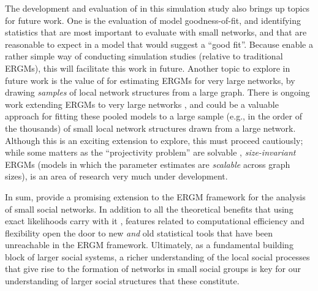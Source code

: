 \documentclass[review, nonatbib,doubleblind]{elsarticle/elsarticle}
\begin{document}
The development and evaluation of \ergmitos{} in this simulation study also brings up topics for future work. One is the evaluation of model goodness-of-fit, and identifying statistics that are most important to evaluate with small networks, and that are reasonable to expect in a model that would suggest a ``good fit''. Because \ergmitos{} enable a rather simple way of conducting simulation studies (relative to traditional ERGMs), this will facilitate this work in future. Another topic to explore in future work is the value of \ergmitos{} for estimating ERGMs for very large networks, by drawing \textit{samples} of local network structures from a large graph. There is ongoing work extending ERGMs to very large networks \cite{STIVALA2016167,Stivala2020}, and \ergmitos{} could be a valuable approach for fitting these pooled models to a large sample (e.g., in the order of the thousands) of small local network structures drawn from a large network. Although this is an exciting extension to explore, this must proceed cautiously; while some matters as the ``projectivity problem'' \cite{shalizi2013} are solvable \cite{Krivitsky2011,Krivitsky2015,schweinberger2017note}, \textit{size-invariant} ERGMs (models in which the parameter estimates are \textit{scalable} across graph sizes), is an area of research very much under development.

In sum,  \ergmitos{} provide a promising extension to the ERGM framework for the analysis of small social networks. In addition to all the theoretical benefits that using exact likelihoods carry with it \cite{Handcock2003}, features related to computational efficiency and flexibility open the door to new \textit{and} old statistical tools that have been unreachable in the ERGM framework. Ultimately, as a fundamental building block of larger social systems, a richer understanding of the local social processes that give rise to the formation of networks in small social groups is key for our understanding of larger social structures that these constitute. 

\clearpage



\end{document}
